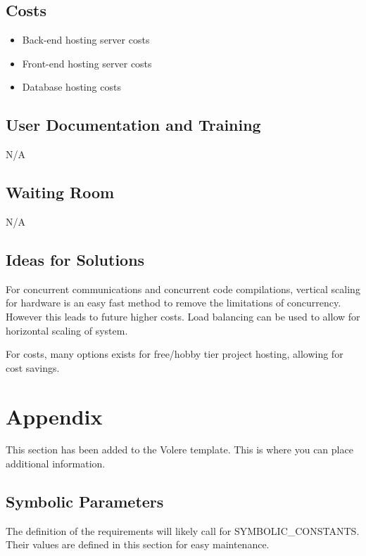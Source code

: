\documentclass[12pt, titlepage]{article}
\begin{document}
\subsection{Costs}
\begin{itemize}
    \item Back-end hosting server costs
    \item Front-end hosting server costs
    \item Database hosting costs
\end{itemize}

\subsection{User Documentation and Training}
N/A

\subsection{Waiting Room}
N/A

\subsection{Ideas for Solutions}
For concurrent communications and concurrent code compilations, vertical scaling for hardware is an easy fast method to remove the limitations of concurrency. However this leads to future higher costs. Load balancing can be used to allow for horizontal scaling of system.

For costs, many options exists for free/hobby tier project hosting, allowing for cost savings.





\newpage

\section{Appendix}

This section has been added to the Volere template.  This is where you can place
additional information.

\subsection{Symbolic Parameters}

The definition of the requirements will likely call for SYMBOLIC\_CONSTANTS.
Their values are defined in this section for easy maintenance.
\end{document}
